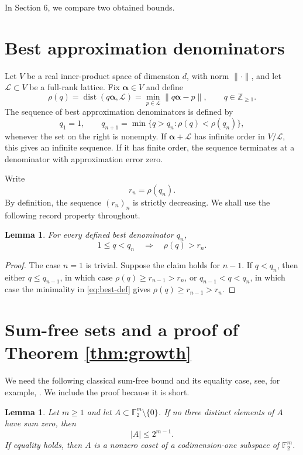 \documentclass[11pt,reqno]{amsart}
\newtheorem{lemma}[theorem]{Lemma}
\theoremstyle{definition}
\newcommand{\F}{\mathbb F}
\newcommand{\Z}{\mathbb Z}
\newcommand{\0}{\mbf 0}%
\def\Z{\mathbb Z}
\newcommand{\cL}{\mathcal L}
\newcommand{\balpha}{\boldsymbol{\alpha}}
\newcommand{\dist}{\operatorname{dist}}
\begin{document}
In Section 6, we compare two obtained bounds.

\section{Best approximation denominators}

Let $V$ be a real inner-product space of dimension $d$, with norm
$\|\cdot\|$, and let $\cL\subset V$ be a full-rank lattice. Fix
$\balpha\in V$ and define
$$
 \rho(q)=\dist(q\balpha,\cL)=\min_{p\in\cL}\|q\balpha-p\|,
 \qquad q\in\Z_{\ge1}.
$$
The sequence of best approximation denominators is defined by
\begin{equation}\label{eq:best-def}
 q_1=1,\qquad
 q_{n+1}=\min\{q>q_n:\rho(q)<\rho(q_n)\},
\end{equation}
whenever the set on the right is nonempty. If $\balpha+\cL$ has infinite
order in $V/\cL$, this gives an infinite sequence. If it has finite order, the
sequence terminates at a denominator with approximation error zero.

Write
$$
 r_n=\rho(q_n).
$$
By definition, the sequence $(r_n)_n$ is strictly decreasing. We shall use the
following record property throughout.

\begin{lemma}\label{lem:record}
For every defined best denominator $q_n$,
$$
 1\le q<q_n \quad\Longrightarrow\quad \rho(q)>r_n.
$$
\end{lemma}

\begin{proof}
The case $n=1$ is trivial. Suppose the claim holds for $n-1$. If $q<q_n$,
then either $q\le q_{n-1}$, in which case
$\rho(q)\ge r_{n-1}>r_n$, or $q_{n-1}<q<q_n$, in which case the minimality
in \eqref{eq:best-def} gives $\rho(q)\ge r_{n-1}>r_n$.
\end{proof}

\section{Sum-free sets and a proof of Theorem \ref{thm:growth}}

We need the following classical sum-free bound and its equality case, see, for example, \cite{ClarkPedersen1992,GreenRuzsa2005}. We include the proof because it is short.

\begin{lemma}\label{lem:sum-free}
Let $m\ge1$ and let $A\subset \F_2^m\setminus\{0\}$. If no three distinct
elements of $A$ have sum zero, then
$$
 |A|\le 2^{m-1}.
$$
If equality holds, then $A$ is a nonzero coset of a codimension-one subspace
of $\F_2^m$.
\end{lemma}
\end{document}
